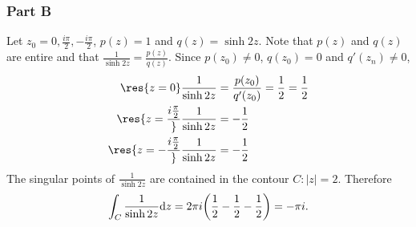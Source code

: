 \documentclass[12pt]{extarticle}
\begin{document}
\begin{problem} \subsubsection*{Part B} %
    Let $z_0 = {0, \frac{i\pi}{2}, -\frac{i\pi}{2}}$, $p(z) = 1$ and $q(z) = \sinh 2z$. Note that $p(z)$ and $q(z)$ are entire and that $\frac{1}{\sinh 2z} = \frac{p(z)}{q(z)}$. Since $p(z_0) \neq 0$, $q(z_0) = 0$ and $q'(z_n) \neq 0$,
    \begin{align*}
        \res{z=0} \frac{1}{\sinh 2z} &= \frac{p(z_0)}{q'(z_0)} = \frac{1}{2} = \frac{1}{2} \\
        \res{z=\frac{i \frac{\pi}{2}}} \frac{1}{\sinh 2z} &= -\frac{1}{2} \\
        \res{z=-\frac{i \frac{\pi}{2}}} \frac{1}{\sinh 2z} &= -\frac{1}{2}
    \end{align*}
    The singular points of $\frac{1}{\sinh 2z}$ are contained in the contour $C : |z| = 2$. Therefore
    \[
        \int_C \frac{1}{\sinh 2z} \dd z = 2 \pi i \qty(\frac{1}{2} - \frac{1}{2} - \frac{1}{2}) = - \pi i
    .\]
\end{problem}
\end{document}
